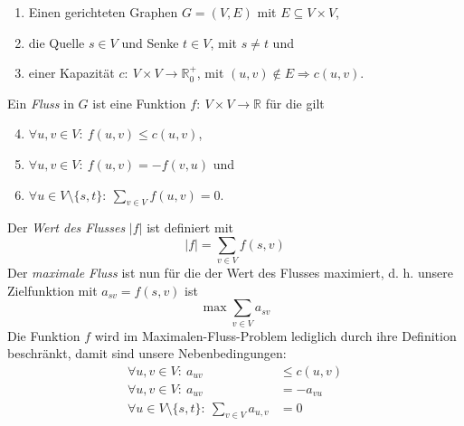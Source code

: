 \documentclass[a4paper,10pt]{article}
\begin{document}
\begin{enumerate}
        \begin{enumerate}
        \item   Einen gerichteten Graphen $G = (V,E)$ mit $E \subseteq V \times V$,
        \item   die Quelle $s \in V$ und Senke $t \in V$, mit $s \neq t$ und
        \item   einer Kapazität $c{:}\ V \times V \to \mathbb{R}_0^+$, mit $(u,v) \notin E \Rightarrow c(u,v)$.
        \end{enumerate}
        Ein \emph{Fluss} in $G$ ist eine Funktion $f{:}\ V \times V \to \mathbb{R}$ für die gilt
        \begin{enumerate}
        \setcounter{enumii}{3}
        \item   $\forall u,v \in V{:}\ f(u,v) \leq c(u,v)$,
        \item   $\forall u,v \in V{:}\ f(u,v) = -f(v,u)$ und
        \item   $\forall u \in V \setminus \{s,t\}{:}\ \sum\limits_{v \in V} f(u,v) = 0  $.
        \end{enumerate}
        Der \emph{Wert des Flusses} $|f|$ ist definiert mit
        \[|f| = \sum\limits_{v \in V} f(s,v)\]
        Der \emph{maximale Fluss} ist nun für die der Wert des Flusses maximiert, d. h. unsere Zielfunktion mit $a_{sv} = f(s,v)$ ist
        \[ \max \sum\limits_{v \in V} a_{sv} \]
        Die Funktion $f$ wird im Maximalen-Fluss-Problem lediglich durch ihre Definition beschränkt, damit sind unsere Nebenbedingungen:
        \begin{align*}
                                              \forall u,v \in V{:}\ a_{uv}  &\leq c(u,v) \\
                                              \forall u,v \in V{:}\ a_{uv}  &= -a_{vu} \\
        \forall u \in V \setminus \{s,t\}{:}\ \sum\limits_{v \in V} a_{u,v}  &= 0 \\
        \end{align*}
\end{enumerate}



\end{document}

